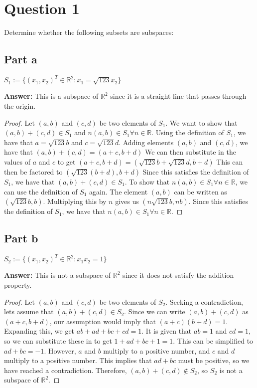 \documentclass{article}
\begin{document}
\section*{Question 1}
Determine whether the following subsets are subspaces:

\subsection*{Part a}
$S_{1} := \{(x_{1},x_{2})^{T} \in \mathbb{R}^2 : x_{1} = \sqrt{123}x_{2}\}$

\textbf{Answer:} This is a subspace of $\mathbb{R}^2$ since it is a straight line that passes through the origin.

\begin{proof}
Let $(a,b)$ and $(c,d)$ be two elements of $S_{1}$.
We want to show that $(a,b) + (c,d) \in S_{1}$ and $n(a,b) \in S_{1} \forall n \in \mathbb{R}$.
Using the definition of $S_{1}$, we have that $a=\sqrt{123}b$ and $c=\sqrt{123}d$.
Adding elements $(a,b)$ and $(c,d)$, we have that $(a,b) + (c,d) = (a+c,b+d)$
We can then substitute in the values of $a$ and $c$ to get $(a+c,b+d) = (\sqrt{123}b+\sqrt{123}d,b+d)$
This can then be factored to $(\sqrt{123}(b+d),b+d)$
Since this satisfies the definition of $S_{1}$, we have that $(a,b) + (c,d) \in S_{1}$.
To show that $n(a,b) \in S_{1} \forall n \in \mathbb{R}$, we can use the definition of $S_{1}$ again.
The element $(a,b)$ can be written as $(\sqrt{123}b,b)$.
Multiplying this by $n$ gives us $(n\sqrt{123}b,nb)$.
Since this satisfies the definition of $S_{1}$, we have that $n(a,b) \in S_{1} \forall n \in \mathbb{R}$.
\end{proof}

\subsection*{Part b}
$S_{2} := \{(x_{1},x_{2})^{T} \in \mathbb{R}^2 : x_{1}x_{2} = 1\}$

\textbf{Answer:} This is not a subspace of $\mathbb{R}^2$ since it does not satisfy the addition property.

\begin{proof}
Let $(a,b)$ and $(c,d)$ be two elements of $S_{2}$.
Seeking a contradiction, lets assume that $(a,b) + (c,d) \in S_{2}$.
Since we can write $(a,b) + (c,d)$ as $(a+c,b+d)$, our assumption would imply that $(a+c)(b+d) = 1$.
Expanding this, we get $ab+ad+bc+cd = 1$.
It is given that $ab=1$ and $cd=1$, so we can substitute these in to get $1+ad+bc+1 = 1$.
This can be simplified to $ad+bc = -1$.
However, $a$ and $b$ multiply to a positive number, and $c$ and $d$ multiply to a positive number.
This implies that $ad+bc$ must be positive, so we have reached a contradiction.
Therefore, $(a,b) + (c,d) \notin S_{2}$, so $S_{2}$ is not a subspace of $\mathbb{R}^2$.
\end{proof}
\end{document}
